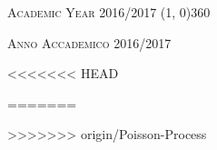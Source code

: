 \documentclass[a4paper, 12pt, twoside, openright,fleqn]{book}
\begin{document}
\begin{titlepage}
\vfill
\begin{center}
\hspace{-0.2cm}
\textsc{Academic Year 2016/2017}
\line(1, 0){360}

\textsc{Anno Accademico 2016/2017}
\end{center}
\end{titlepage}

%

\begingroup %
  \makeatletter
  \let\ps@plain\ps@empty
  \makeatother
  \tableofcontents
  \clearpage
\endgroup
\mainmatter
<<<<<<< HEAD

%

=======



>>>>>>> origin/Poisson-Process
\end{document}
